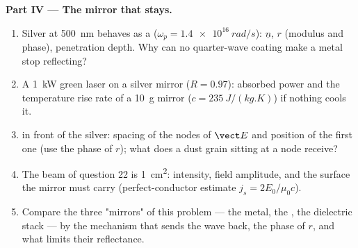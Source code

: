 \begin{problem}
\medskip
\noindent\textbf{Part IV --- The mirror that stays.}
\begin{enumerate}[resume]
  \item Silver at \qty{500}{nm} behaves as a  ($\omega_p = \qty{1.4e16}{rad/s}$):
        $\underline n$, $r$ (modulus and phase), penetration depth. Why can no
        quarter-wave coating make a metal stop reflecting?
  \item A \qty{1}{kW} green laser on a silver mirror ($R = 0.97$): absorbed
        power and the temperature rise rate of a \qty{10}{g} mirror
        ($c = \qty{235}{J/(kg.K)}$) if nothing cools it.
  \item {} in front of the silver: spacing of the nodes of
        $\vect E$ and position of the first one (use the phase of $r$);
        what does a dust grain sitting at a node receive?
  \item The beam of question 22 is \qty{1}{cm^2}: intensity, field
        amplitude, and the surface  the mirror must
        carry (perfect-conductor estimate $j_s = 2E_0/\mu_0c$).
  \item Compare the three "mirrors" of this problem --- the metal, the
        , the dielectric stack --- by the mechanism that sends
        the wave back, the phase of $r$, and what limits their
        reflectance.
\end{enumerate}
\end{problem}
